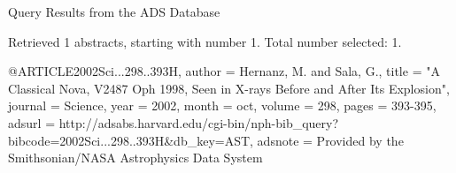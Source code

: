 Query Results from the ADS Database


Retrieved 1 abstracts, starting with number 1.  Total number selected: 1.

@ARTICLE{2002Sci...298..393H,
   author = {{Hernanz}, M. and {Sala}, G.},
    title = "{A Classical Nova, V2487 Oph 1998, Seen in X-rays Before and After Its Explosion}",
  journal = {Science},
     year = 2002,
    month = oct,
   volume = 298,
    pages = {393-395},
   adsurl = {http://adsabs.harvard.edu/cgi-bin/nph-bib_query?bibcode=2002Sci...298..393H&db_key=AST},
  adsnote = {Provided by the Smithsonian/NASA Astrophysics Data System}
}


